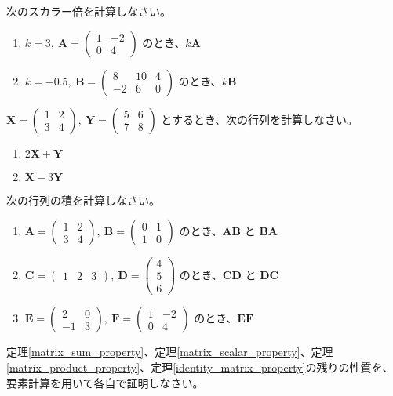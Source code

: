 \begin{quiz}
次のスカラー倍を計算しなさい。
\begin{enumerate}
\item $k = 3,\ \bm{A} = \begin{pmatrix} 1 & -2 \\ 0 & 4 \end{pmatrix}$ のとき、$k\bm{A}$
\item $k = -0.5,\ \bm{B} = \begin{pmatrix} 8 & 10 & 4 \\ -2 & 6 & 0 \end{pmatrix}$ のとき、$k\bm{B}$
\end{enumerate}
\end{quiz}

\begin{quiz}
$\bm{X} = \begin{pmatrix} 1 & 2 \\ 3 & 4 \end{pmatrix},\ \bm{Y} = \begin{pmatrix} 5 & 6 \\ 7 & 8 \end{pmatrix}$ とするとき、次の行列を計算しなさい。
\begin{enumerate}
\item $2\bm{X} + \bm{Y}$
\item $\bm{X} - 3\bm{Y}$
\end{enumerate}
\end{quiz}

\begin{quiz}
次の行列の積を計算しなさい。
\begin{enumerate}
\item $\bm{A} = \begin{pmatrix} 1 & 2 \\ 3 & 4 \end{pmatrix},\ \bm{B} = \begin{pmatrix} 0 & 1 \\ 1 & 0 \end{pmatrix}$ のとき、$\bm{A}\bm{B}$ と $\bm{B}\bm{A}$
\item $\bm{C} = \begin{pmatrix} 1 & 2 & 3 \end{pmatrix},\ \bm{D} = \begin{pmatrix} 4 \\ 5 \\ 6 \end{pmatrix}$ のとき、$\bm{C}\bm{D}$ と $\bm{D}\bm{C}$
\item $\bm{E} = \begin{pmatrix} 2 & 0 \\ -1 & 3 \end{pmatrix},\ \bm{F} = \begin{pmatrix} 1 & -2 \\ 0 & 4 \end{pmatrix}$ のとき、$\bm{E}\bm{F}$
\end{enumerate}
\end{quiz}

\begin{quiz}[定理の証明演習]
定理\ref{matrix_sum_property}、定理\ref{matrix_scalar_property}、定理\ref{matrix_product_property}、定理\ref{identity_matrix_property}の残りの性質を、要素計算を用いて各自で証明しなさい。
\end{quiz}